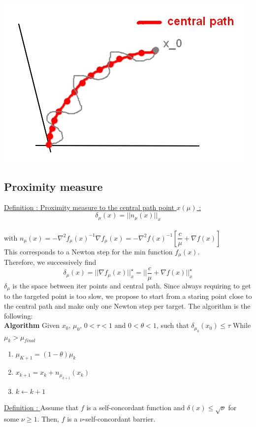 \documentclass[10pt,a4paper]{article}
\begin{document}
\begin{center}
\includegraphics[scale=0.3]{fig2.jpg} 
\end{center}
\subsection{Proximity measure}
\underline{Definition : Proximity measure to the central path point $x(\mu)$ :}\\ $$ \delta_{\mu}(x) = || n_{\mu}(x) ||_x $$\\
 with $n_{\mu}(x) = - \nabla^2 f_{\mu}(x)^{-1} \nabla f_{\mu}(x) = - \nabla^2 f(x)^{-1} [\dfrac{c}{\mu} + \nabla f(x)]$\\
 This corresponds to a Newton step for the min function $f_{\mu}(x)$.\\ Therefore, we successively find
$$\delta_{\mu}(x) = || \nabla f_{\mu}(x) ||_x^{\star} = || \dfrac{c}{\mu} + \nabla f(x) ||_x^{\star}$$
$\delta_{\mu}$ is the space between iter points and central path. Since always requiring to get to the targeted point is too slow, we propose to start from a staring point close to the central path and make only one Newton step per target. The algorithm is the following:\\
\textbf{Algorithm} \newline
Given $x_0$, $\mu_0$, $0 < \tau < 1$ and $0 < \theta < 1$, such that $\delta_{\mu_0}(x_0) \leq \tau$ \newline
While $\mu_k > \mu_{final}$
\begin{enumerate}
\item $\mu_{K+1} = (1 - \theta) \mu_k$ 
\item $x_{k+1} = x_k + n_{\mu_{k+1}}(x_k)$
\item $k \leftarrow k + 1$
\end{enumerate}
\underline{Definition : } Assume that $f$ is a self-concordant function and $\delta (x) \leq \sqrt{\nu}$ for some $\nu \geq 1$. Then, $f$ is a $\nu$-self-concordant barrier.
\end{document}
